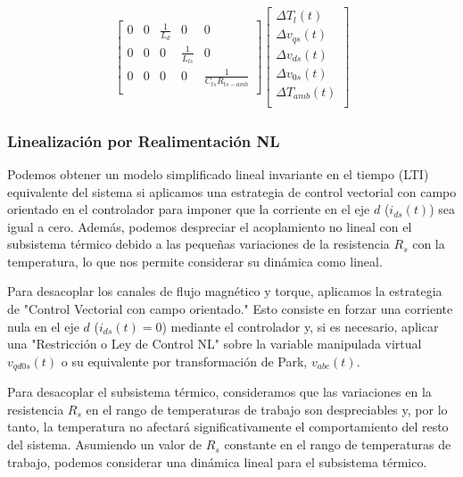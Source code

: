 \documentclass{article}
\begin{document}
\begin{itemize}
\begin{equation*}
\begin{gathered}
\begin{bmatrix}
        0 & 0 & \frac{1}{L_{d}} & 0 & 0\\
        0 & 0 & 0 & \frac{1}{L_{ls}} & 0\\
        0 & 0 & 0 & 0 & \frac{1}{C_{ts}R_{ts-amb}}\\
    \end{bmatrix}
    \begin{bmatrix}
        \Delta{T}_{l}(t)\\
        \Delta{v}_{qs}(t)\\
        \Delta{v}_{ds}(t)\\
        \Delta{v}_{0s}(t)\\
        \Delta T_{amb}(t)\\
    \end{bmatrix} 
\end{gathered}
\end{equation*}

\end{itemize}


\subsubsection{Linealización por Realimentación NL}

Podemos obtener un modelo simplificado lineal invariante en el tiempo (LTI) equivalente del sistema
si aplicamos una estrategia de control vectorial con campo orientado en el controlador para imponer
que la corriente en el eje $d$ ($i_{ds}(t)$) sea igual a cero. Además, podemos despreciar 
el acoplamiento no lineal con el subsistema térmico debido a las pequeñas variaciones de la 
resistencia \(R_s\) con la temperatura, lo que nos permite considerar su dinámica como lineal.

Para desacoplar los canales de flujo magnético y torque, aplicamos la estrategia de 
"Control Vectorial con campo orientado." Esto consiste en forzar una corriente nula en el eje 
$d$ ($i_{ds}(t) = 0$) mediante el controlador y, si es necesario, aplicar una "Restricción o Ley 
de Control NL" sobre la variable manipulada virtual \(v_{qd0s}(t)\) o su equivalente por 
transformación de Park, \(v_{{abc}}(t)\).

Para desacoplar el subsistema térmico, consideramos que las variaciones en la resistencia \(R_s\) 
en el rango de temperaturas de trabajo son despreciables y, por lo tanto, la temperatura no 
afectará significativamente el comportamiento del resto del sistema. Asumiendo un valor de $R_s$ constante
en el rango de temperaturas de trabajo, podemos considerar una dinámica lineal para el subsistema térmico.
\end{document}
